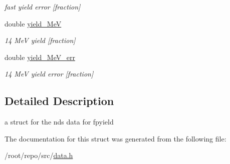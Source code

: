 \begin{DoxyCompactItemize}
\begin{DoxyCompactList}\small\item\em fast yield error \mbox{[}fraction\mbox{]} \end{DoxyCompactList}\item 
\mbox{\label{structpyne_1_1ndsfpysub_afb3737be03fedddc6f54fa3a0e59f0e8}} 
double \hyperlink{structpyne_1_1ndsfpysub_afb3737be03fedddc6f54fa3a0e59f0e8}{yield\+\_\+MeV}
\begin{DoxyCompactList}\small\item\em 14 MeV yield \mbox{[}fraction\mbox{]} \end{DoxyCompactList}\item 
\mbox{\label{structpyne_1_1ndsfpysub_a7bc2487245689a3f6a095f2254e66e99}} 
double \hyperlink{structpyne_1_1ndsfpysub_a7bc2487245689a3f6a095f2254e66e99}{yield\+\_\+Me\+V\+\_\+err}
\begin{DoxyCompactList}\small\item\em 14 MeV yield error \mbox{[}fraction\mbox{]} \end{DoxyCompactList}\end{DoxyCompactItemize}


\subsection{Detailed Description}
a struct for the nds data for fpyield 

The documentation for this struct was generated from the following file\+:\begin{DoxyCompactItemize}
\item 
/root/repo/src/\hyperlink{data_8h}{data.\+h}\end{DoxyCompactItemize}
